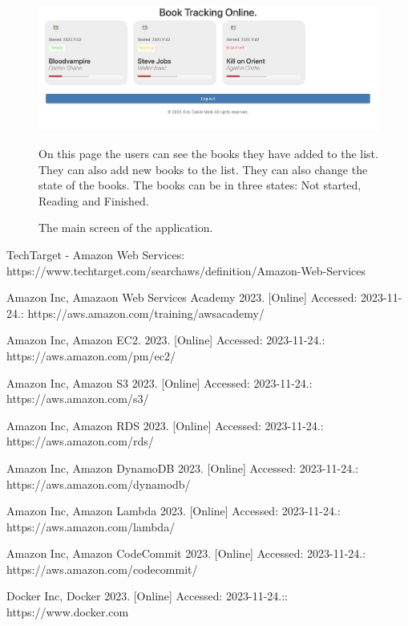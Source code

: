 \documentclass[11pt,a4paper,oneside]{report}
\begin{document}
\begin{figure}[!ht]
  \begin{center}
    \includegraphics[scale=0.3]{frontend-main.png}
    \caption{The main screen of the application.}
    \label{fig:TexnicCenter}
  \end{center}
  On this page the users can see the books they have added to the list. They can also add new books to the list. They can also change the state of the books. The books can be in three states: Not started, Reading and Finished.
\end{figure}



\begin{thebibliography}{9}
  TechTarget - Amazon Web Services: https://www.techtarget.com/searchaws/definition/Amazon-Web-Services

  Amazon Inc, Amazaon Web Services Academy 2023. [Online] Accessed: 2023-11-24.: https://aws.amazon.com/training/awsacademy/

  Amazon Inc, Amazon EC2. 2023. [Online] Accessed: 2023-11-24.: https://aws.amazon.com/pm/ec2/

  Amazon Inc, Amazon S3 2023. [Online] Accessed: 2023-11-24.: https://aws.amazon.com/s3/

  Amazon Inc, Amazon RDS 2023. [Online] Accessed: 2023-11-24.: https://aws.amazon.com/rds/

  Amazon Inc, Amazon DynamoDB 2023. [Online] Accessed: 2023-11-24.: https://aws.amazon.com/dynamodb/

  Amazon Inc, Amazon Lambda 2023. [Online] Accessed: 2023-11-24.: https://aws.amazon.com/lambda/

  Amazon Inc, Amazon CodeCommit 2023. [Online] Accessed: 2023-11-24.: https://aws.amazon.com/codecommit/

  Docker Inc, Docker 2023. [Online] Accessed: 2023-11-24.:: https://www.docker.com


\end{thebibliography}
\end{document}
